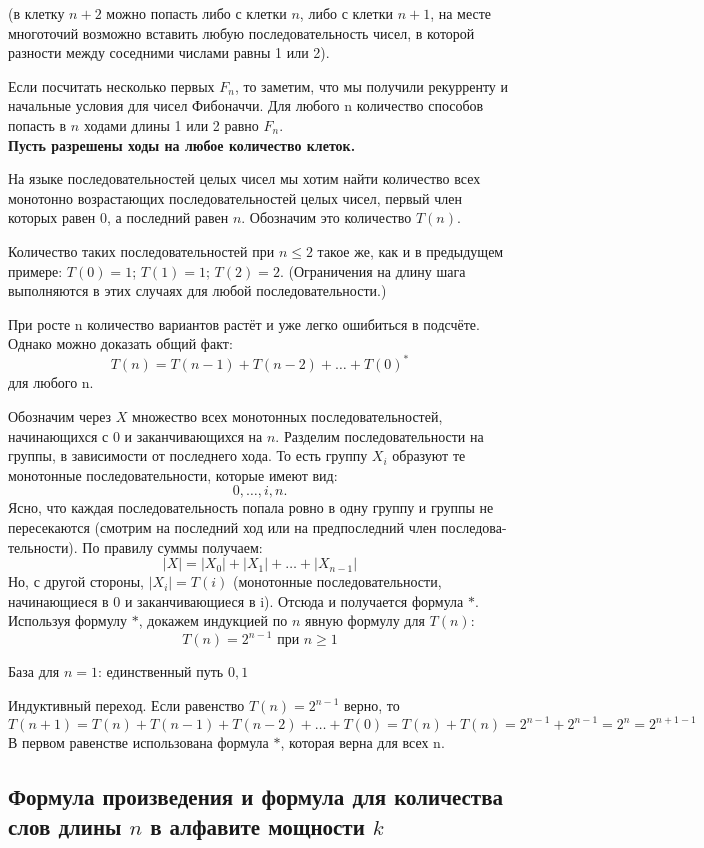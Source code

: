 \documentclass[a4paper, 10pt]{article}
\begin{document}
(в клетку $n + 2$ можно попасть либо с клетки $n$, либо с клетки $n + 1$, на месте многоточий возможно вставить любую последовательность чисел, в которой разности между соседними числами равны 1 или 2).

Если посчитать несколько первых $F_n$, то заметим, что мы получили рекурренту и начальные условия для чисел Фибоначчи. Для любого n количество способов попасть в $n$ ходами длины 1 или 2 равно $F_n$. \\

\textbf{Пусть разрешены ходы на любое количество клеток.}

На языке последовательностей целых чисел мы хотим найти количество всех монотонно возрастающих последовательностей целых чисел, первый член которых
равен 0, а последний равен $n$. Обозначим это количество $T(n)$.

Количество таких последовательностей при $n \leqslant 2$ такое же, как и в предыдущем примере: $T(0) = 1$; $T(1) = 1$; $T(2) = 2$. (Ограничения на длину шага выполняются в этих случаях для любой последовательности.)

При росте n количество вариантов растёт и уже легко ошибиться в подсчёте. Однако можно доказать общий факт: $$T(n) = T(n - 1) + T(n-2) + \dots + T(0)^{*}$$ для любого n.

Обозначим через $X$ множество всех монотонных последовательностей, начинающихся с 0 и заканчивающихся на $n$. Разделим последовательности на группы, в зависимости от последнего хода. То есть группу $X_i$ образуют те монотонные последовательности, которые имеют вид: $$0, \dots, i, n.$$ Ясно, что каждая последовательность попала ровно в одну группу и группы не пересекаются (смотрим на последний ход или на предпоследний член последова- тельности). По правилу суммы получаем: $$|X| = |X_0| + |X_1| + \dots + |X_{n-1}|$$ Но, с другой стороны, $|X_i| = T(i)$ (монотонные последовательности, начинающиеся в 0 и заканчивающиеся в i). Отсюда и получается формула $*$. Используя формулу $*$, докажем индукцией по $n$ явную формулу для $T(n)$: $$T(n) = 2^{n-1} \text{ при } n \geqslant 1$$

База для $n = 1$: единственный путь $0, 1$

Индуктивный переход. Если равенство $T(n) = 2^{n - 1}$ верно, то $$T(n+1) = T(n) + T(n-1) + T(n-2) + \dots + T(0) = T(n) + T(n) = 2^{n - 1} + 2^{n - 1} = 2^n = 2^{n + 1 - 1}$$ В первом равенстве использована формула $*$, которая верна для всех n.

\subsection{Формула произведения и формула для количества слов длины $n$ в алфавите мощности $k$}
\end{document}
